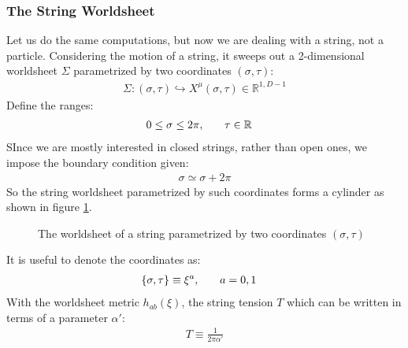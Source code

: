 \subsubsection{The String Worldsheet}
Let us do the same computations, but now we are dealing with a string, not a particle. Considering the motion of a string, it sweeps out a 2-dimensional worldsheet $\Sigma$ parametrized by two coordinates $(\sigma, \tau)$:
\begin{align}
    \Sigma : (\sigma,\tau) \hookrightarrow X^{\mu} (\sigma, \tau) \in \mathbb{R} ^{1,D-1}
\end{align}
Define the ranges:
\begin{align}
    0 \le \sigma \le 2\pi, & \qq{} \tau \in \mathbb{R}
\end{align}
SInce we are mostly interested in closed strings, rather than open ones, we impose the boundary condition given:
\begin{align}
    \sigma \simeq \sigma + 2\pi
\end{align}
So the string worldsheet parametrized by such coordinates forms a cylinder as shown in figure \ref{fig:worldsheet}.
\begin{figure}
    \centering
    \caption{The worldsheet of a string parametrized by two coordinates $(\sigma, \tau)$}
    \label{fig:worldsheet}
\end{figure}
It is useful to denote the coordinates as:
\begin{align}
    \lbrace \sigma, \tau \rbrace \equiv \xi ^{a}, & \qq{} a=0,1
\end{align}
With the worldsheet metric $h_{ab} (\xi)$, the string tension $T$ which can be written in terms of a parameter $\alpha '$:
\begin{align}
    T \equiv \frac{1}{2\pi \alpha '}    
\end{align}
